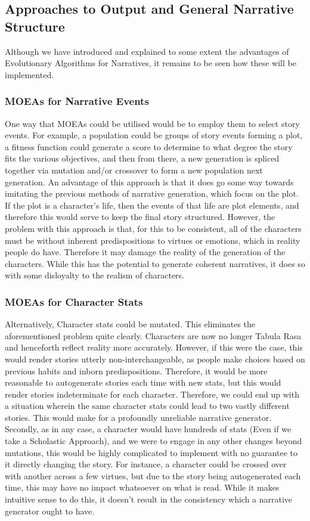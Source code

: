 \documentclass[11pt]{article}
\begin{document}
\subsection{Approaches to Output and General Narrative Structure}
Although we have introduced and explained to some extent the advantages of Evolutionary Algorithms for Narratives, it remains to be seen how these will be implemented. 
\subsubsection{MOEAs for Narrative Events}
One way that MOEAs could be utilised would be to employ them to select story events. For example, a population could be groups of story events forming a plot, a fitness function could generate a score to determine to what degree the story fits the various objectives, and then from there, a new generation is spliced together via mutation and/or crossover to form a new population next generation. An advantage of this approach is that it does go some way towards imitating the previous methods of narrative generation, which focus on the plot. If the plot is a character's life, then the events of that life are plot elements, and therefore this would serve to keep the final story structured. However, the problem with this approach is that, for this to be consistent, all of the characters must be without inherent predispositions to virtues or emotions, which in reality people do have. Therefore it may damage the reality of the generation of the characters. While this has the potential to generate coherent narratives, it does so with some disloyalty to the realism of characters.  \\
\subsubsection{MOEAs for Character Stats} 
Alternatively, Character stats could be mutated. This eliminates the aforementioned problem quite clearly. Characters are now no longer Tabula Rasa and henceforth reflect reality more accurately. However, if this were the case, this would render stories utterly non-interchangeable, as people make choices based on previous habits and inborn predispositions. Therefore, it would be more reasonable to autogenerate stories each time with new stats, but this would render stories indeterminate for each character. Therefore, we could end up with a situation wherein the same character stats could lead to two vastly different stories. This would make for a profoundly unreliable narrative generator. Secondly, as in any case, a character would have hundreds of stats (Even if we take a Scholastic Approach), and we were to engage in any other changes beyond mutations, this would be highly complicated to implement with no guarantee to it directly changing the story. For instance, a character could be crossed over with another across a few virtues, but due to the story being autogenerated each time, this may have no impact whatsoever on what is read. While it makes intuitive sense to do this, it doesn't result in the consistency which a narrative generator ought to have. \\
\end{document}
